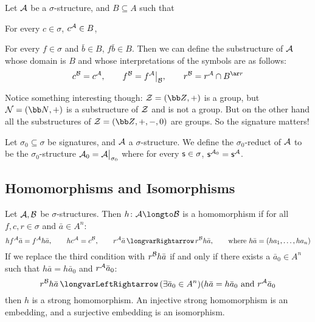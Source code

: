 \bdefn

    Let ${\cal A}$ be a $\sigma$-structure, and $B\subseteq A$ such that
    \benum
        \item For every $c\in\sigma$, $c^{\cal A}\in B$,
        \item For every $f\in\sigma$ and $\bar b\in B$, $f\bar b\in B$.
    \eenum
    Then we can define the {\emphcolor substructure} of ${\cal A}$ whose domain is $B$ and whose
    interpretations of the symbols are as follows:
    $$ c^{\cal B} = c^{\cal A},\qquad f^{\cal B} = f^{\cal A}\bigl|_{\cal B},\qquad
    r^{\cal B} = r^{\cal A}\cap B^{\ar r} $$

\edefn

Notice something interesting though: ${\cal Z}=({\bb Z},+)$ is a group, but
${\cal N}=({\bb N},+)$ is a substructure of ${\cal Z}$ and is not a group.
But on the other hand all the substructures of ${\cal Z}=({\bb Z},+,-,0)$ are groups.
So the signature matters!

\bdefn

    Let $\sigma_0\subseteq\sigma$ be signatures, and ${\cal A}$ a $\sigma$-structure.
    We define the {\emphcolor $\sigma_0$-reduct} of ${\cal A}$ to be the $\sigma_0$-structure
    ${\cal A}_0={\cal A}\bigl|_{\sigma_0}$ where for every ${\sf s}\in\sigma$,
    ${\sf s}^{{\cal A}_0}={\sf s}^{\cal A}$.

\edefn

\subsection{Homomorphisms and Isomorphisms}

\bdefn

    Let ${\cal A},{\cal B}$ be $\sigma$-structures.
    Then $h\colon\c A\longto\c B$ is a {\emphcolor homomorphism} if for all $f,c,r\in\sigma$ and
    $\bar a\in A^n$:
    $$ hf^{\cal A}\bar a = f^{\cal A}h\bar a,\qquad
    hc^{\cal A}=c^{\cal B},\qquad r^{\cal A}\bar a\implies r^{\cal B}h\bar a,\qquad
    \hbox{where $h\bar a=(ha_1,\dots,ha_n)$} $$
    If we replace the third condition with $r^{\cal B}h\bar a$ if and only if there exists a
    $\bar a_0\in A^n$ such that $h\bar a=h\bar a_0$ and $r^{\cal A}\bar a_0$:
    $$ r^{\cal B}h\bar a \iff (\exists\bar a_0\in A^n)(h\bar a=h\bar a_0\hbox{ and }
    r^{\cal A}\bar a_0 $$
    then $h$ is a {\emphcolor strong homomorphism}.
    An injective strong homomorphism is an {\emphcolor embedding}, and a surjective embedding is
    an {\emphcolor isomorphism}.

